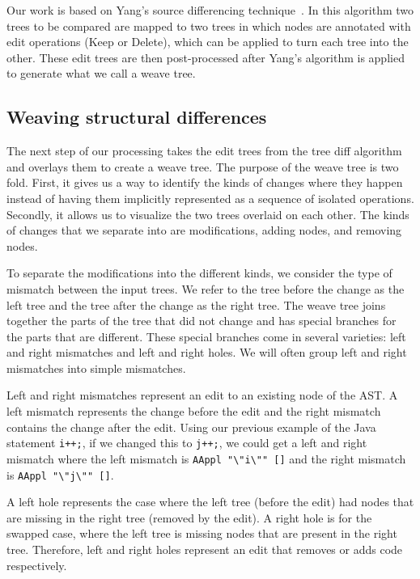 Our work is based on Yang's source differencing technique~\cite{yang91diff}.
In this algorithm two trees to be compared are mapped to two trees in which
nodes are annotated with edit operations (Keep or Delete), which can be applied
to turn each tree into the other.  These edit trees are then post-processed
after Yang's algorithm is applied to generate what we call a weave tree.
\subsection{Weaving structural differences}
\label{sec:weaving}

The next step of our processing takes the edit trees from the tree diff
algorithm and overlays them to create a weave tree. The purpose of the weave
tree is two fold. First, it gives us a way to identify the kinds of changes
where they happen instead of having them implicitly represented as a sequence
of isolated operations. Secondly, it allows us to visualize the two trees
overlaid on each other. The kinds of changes that we separate into are
modifications, adding nodes, and removing nodes.

To separate the modifications into the different kinds, we consider the type of
mismatch between the input trees. We refer to the tree before the change as the
left tree and the tree after the change as the right tree. The weave tree joins
together the parts of the tree that did not change and has special branches for
the parts that are different. These special branches come in several varieties:
left and right mismatches and left and right holes. We will often group left
and right mismatches into simple mismatches.

Left and right mismatches represent an edit to an existing node of the AST\@.
A left mismatch represents the change before the edit and the right mismatch
contains the change after the edit.  Using our previous example of the Java
statement {\tt i++;}, if we changed this to {\tt j++;}, we could get a left
and right mismatch where the left mismatch is {\tt AAppl
"\textbackslash"i\textbackslash"" []} and the right mismatch is {\tt AAppl
"\textbackslash"j\textbackslash"" []}. 

A left hole represents the case where the left tree (before the edit) had nodes
that are missing in the right tree (removed by the edit). A right hole is for
the swapped case, where the left tree is missing nodes that are present in the
right tree. Therefore, left and right holes represent an edit that removes or
adds code respectively.

